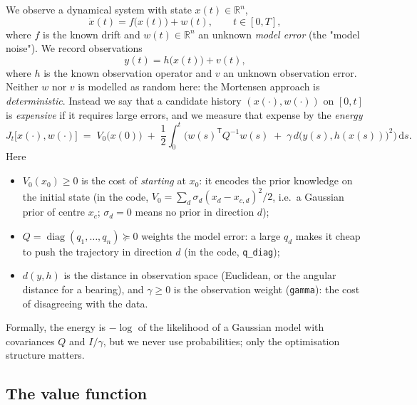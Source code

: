 \documentclass[11pt,a4paper]{article}
\newcommand{\R}{\mathbb{R}}
\newcommand{\dd}{\,\mathrm{d}}
\newcommand{\T}{^{\mathsf T}}
\theoremstyle{plain}
\theoremstyle{definition}
\theoremstyle{remark}
\begin{document}
We observe a dynamical system with state $x(t)\in\R^n$,
\begin{equation}
  \dot x(t) = f\big(x(t)\big) + w(t), \qquad t\in[0,T],
  \label{eq:dyn}
\end{equation}
where $f$ is the known drift and $w(t)\in\R^n$ an unknown \emph{model error} (the "model noise"). We record observations
\begin{equation}
  y(t) = h\big(x(t)\big) + v(t),
  \label{eq:obs}
\end{equation}
where $h$ is the known observation operator and $v$ an unknown observation error. Neither $w$ nor $v$ is modelled as random here: the Mortensen approach is \emph{deterministic}. Instead we say that a candidate history $(x(\cdot), w(\cdot))$ on $[0,t]$ is \emph{expensive} if it requires large errors, and we measure that expense by the \emph{energy}
\begin{equation}
  J_t\big[x(\cdot), w(\cdot)\big]
  \;=\; V_0\big(x(0)\big)
  \;+\; \frac12\int_0^t \Big( w(s)\T Q^{-1} w(s) \;+\; \gamma\, d\big(y(s), h(x(s))\big)^2 \Big)\dd s .
  \label{eq:energy}
\end{equation}
Here
\begin{itemize}[nosep]
  \item $V_0(x_0)\ge 0$ is the cost of \emph{starting} at $x_0$: it encodes the prior knowledge on the initial state (in the code, $V_0=\sum_d \sigma_d (x_d-x_{c,d})^2/2$, i.e.\ a Gaussian prior of centre $x_c$; $\sigma_d=0$ means no prior in direction $d$);
  \item $Q=\operatorname{diag}(q_1,\dots,q_n)\succeq 0$ weights the model error: a large $q_d$ makes it cheap to push the trajectory in direction $d$ (in the code, \texttt{q\_diag});
  \item $d(y,h)$ is the distance in observation space (Euclidean, or the angular distance for a bearing), and $\gamma\ge0$ is the observation weight (\texttt{gamma}): the cost of disagreeing with the data.
\end{itemize}
Formally, the energy is $-\log$ of the likelihood of a Gaussian model with covariances $Q$ and $I/\gamma$, but we never use probabilities; only the optimisation structure matters.

\subsection{The value function}
\end{document}
